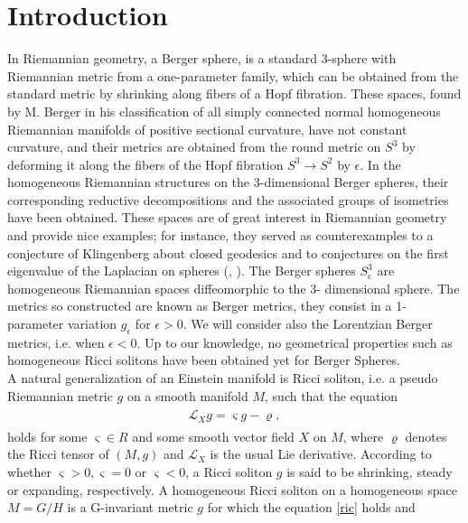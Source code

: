 \documentclass[11pt,oneside,leqno]{amsart}
\theoremstyle{plain}
\begin{document}
\section{Introduction}
In Riemannian geometry, a Berger sphere, is a standard 3-sphere with Riemannian metric from a one-parameter family, which can be obtained from the standard metric by shrinking along fibers of a Hopf fibration. 
 These spaces, found by M. Berger \cite{B1}  in his classification of all simply
connected normal homogeneous Riemannian manifolds of positive sectional curvature,
have not constant curvature, and their metrics are obtained from the round metric on
$S^3$ by deforming it along the fibers of the Hopf fibration $S^3\rightarrow S^2$ by $\epsilon$.
In \cite{g1} the homogeneous Riemannian structures on the 3-dimensional Berger spheres,
their corresponding reductive decompositions and the associated groups of isometries
have been obtained.
These spaces are of great interest in Riemannian geometry and provide nice examples; for instance,
they served as counterexamples to a conjecture of Klingenberg about closed geodesics \cite{p11} and to conjectures on the first eigenvalue of the Laplacian on spheres
(\cite{b1}, \cite{u1}).
The Berger spheres $S_{\epsilon}^3$
are homogeneous Riemannian spaces diffeomorphic to the 3-
dimensional sphere.
The metrics so constructed are known as Berger
metrics, they consist in a 1-parameter variation $g_{\epsilon}$ for $\epsilon >0$. We
will consider also the Lorentzian Berger metrics, i.e. when $\epsilon <0$.
 Up to our knowledge, no geometrical properties such as homogeneous
Ricci solitons have been obtained yet for Berger Spheres.\\
 A natural generalization of an Einstein manifold is Ricci soliton, i.e.   
a pseudo Riemannian metric $g$ on a smooth manifold $M$, such that the equation
\begin{eqnarray}\label{ric}
\begin{array}{cccc}
\mathcal{L}_{X} g =\varsigma g-\varrho,
\end{array}
\end{eqnarray}
holds for some $\varsigma \in R$ and some smooth vector field $X$ on $M$, where $\varrho$
denotes the Ricci tensor of $(M, g)$ and $\mathcal{L}_{X}$ is the usual Lie derivative.
 According
to whether $\varsigma > 0, \varsigma = 0$ or $\varsigma < 0$, a Ricci soliton $g$ is said to be shrinking, steady or expanding, respectively. A homogeneous Ricci soliton on a homogeneous space $M = G/H$ is a G-invariant metric $g$ for which the equation \eqref{ric} holds and
\end{document}
